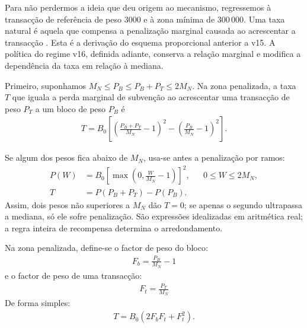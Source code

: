 Para não perdermos a ideia que deu origem ao mecanismo, regressemos à
transacção de referência de peso 3000 e à zona mínima de 300\,000. Uma taxa
natural é aquela que compensa a penalização marginal causada ao acrescentar a
transacção \cite{articmine-36c3-dynamics,jollymore-old-analysis}. Esta é a
derivação do esquema proporcional anterior a v15. A política do regime v16,
definida adiante, conserva a relação marginal e modifica a dependência da
taxa em relação à mediana.

Primeiro, suponhamos $M_N\leq P_B\leq P_B+P_T\leq2M_N$. Na zona penalizada,
a taxa $T$ que iguala a perda marginal de subvenção ao acrescentar uma
transacção de peso $P_T$ a um bloco de peso $P_B$ é
\begin{align*}
T=B_0\left[\left(\frac{P_B+P_T}{M_N}-1\right)^2
          -\left(\frac{P_B}{M_N}-1\right)^2\right].
\end{align*}

Se algum dos pesos fica abaixo de $M_N$, usa-se antes a penalização por ramos:
\begin{align*}
 P(W)&=B_0\left[\max\!\left(0,\frac{W}{M_N}-1\right)\right]^2,
       &&0\leq W\leq2M_N,\\
 T&=P(P_B+P_T)-P(P_B).
\end{align*}
Assim, dois pesos não superiores a $M_N$ dão $T=0$; se apenas o segundo
ultrapassa a mediana, só ele sofre penalização. São expressões idealizadas em
aritmética real; a regra inteira de recompensa determina o arredondamento.

Na zona penalizada, define-se o factor de peso do bloco:
\begin{align*}
F_b=\frac{P_B}{M_N}-1
\end{align*}
e o factor de peso de uma transacção:
\begin{align*}
F_t=\frac{P_T}{M_N}
\end{align*}
De forma simples:
\begin{align*}
T=B_0(2F_bF_t+F_t^2).
\end{align*}




